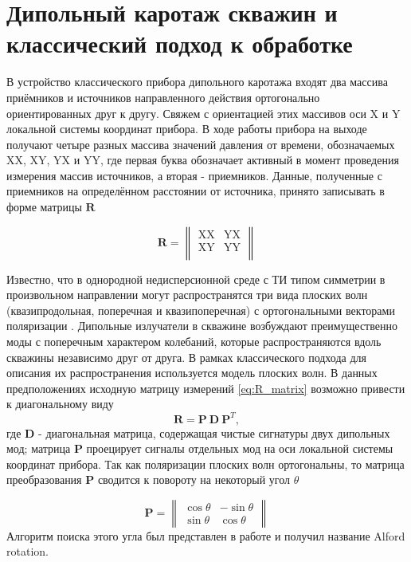 \documentclass[a4paper,11pt]{article}
\begin{document}
\section{Дипольный каротаж скважин и классический подход к обработке}
В устройство классического прибора дипольного каротажа входят два массива приёмников и источников направленного действия ортогонально ориентированных друг к другу. Свяжем с ориентацией этих массивов оси X и Y локальной системы координат прибора. В ходе работы прибора на выходе получают четыре разных массива значений давления от времени, обозначаемых XX, XY, YX и YY, где первая буква обозначает активный в момент проведения измерения массив источников, а вторая - приемников. Данные, полученные с приемников на определённом расстоянии от источника, принято записывать в форме матрицы $\mathbf{R}$ 

\begin{equation}
	\mathbf{R} = \left\|
	\begin{array}{cc}
	\text{XX} & \text{YX} \\
	\text{XY} & \text{YY} \\
	\end{array}
	\right\| 
	\label{eq:R_matrix}
\end{equation}

Известно, что в однородной недисперсионной среде с ТИ типом симметрии в произвольном направлении могут распространятся три вида плоских волн (квазипродольная, поперечная и квазипоперечная) с ортогональными векторами поляризации \cite{Musgrave1970}. Дипольные излучатели в скважине возбуждают преимущественно моды с поперечным характером колебаний, которые распространяются вдоль скважины независимо друг от друга. В рамках классического подхода для описания их распространения используется модель плоских волн.  В данных предположениях исходную матрицу измерений \eqref{eq:R_matrix} возможно привести к диагональному виду \cite{Dellinger1998}
\begin{equation}
	\mathbf{R} = \mathbf{P} \ \mathbf{D} \ \mathbf{P}^T, \label{eq:alford_symmetric} 
\end{equation}
где $\mathbf{D}$ - диагональная матрица, содержащая чистые сигнатуры двух дипольных мод; матрица $\mathbf{P}$ проецирует сигналы отдельных мод на оси локальной системы координат прибора. Так как поляризации плоских волн ортогональны, то матрица преобразования $\mathbf{P}$ сводится к повороту на некоторый угол $\theta$

\begin{equation*}
	\mathbf{P} = \left\|
	\begin{array}{cc}
	\cos \theta &-\sin \theta \\ 
	\sin \theta & \cos \theta
	\end{array} 
	\right\| 
\end{equation*}
Алгоритм поиска этого угла был представлен в работе \cite{Alford1986} и получил название Alford rotation.
\end{document}
